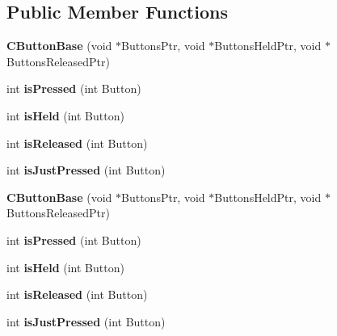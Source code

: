 \subsection*{Public Member Functions}
\begin{DoxyCompactItemize}
\item 
\hypertarget{class_c_button_base_a9c86334a1e2b3ba2c771b2e574c3dc67}{{\bfseries C\-Button\-Base} (void $\ast$Buttons\-Ptr, void $\ast$Buttons\-Held\-Ptr, void $\ast$Buttons\-Released\-Ptr)}\label{class_c_button_base_a9c86334a1e2b3ba2c771b2e574c3dc67}

\item 
\hypertarget{class_c_button_base_a0d4758b9e756a8c3c2bb39b907ea9170}{int {\bfseries is\-Pressed} (int Button)}\label{class_c_button_base_a0d4758b9e756a8c3c2bb39b907ea9170}

\item 
\hypertarget{class_c_button_base_a67e38daead9d22e33f6a3d85902d1f98}{int {\bfseries is\-Held} (int Button)}\label{class_c_button_base_a67e38daead9d22e33f6a3d85902d1f98}

\item 
\hypertarget{class_c_button_base_a575dee487bcca1abf29c1084dfdd5bb8}{int {\bfseries is\-Released} (int Button)}\label{class_c_button_base_a575dee487bcca1abf29c1084dfdd5bb8}

\item 
\hypertarget{class_c_button_base_ab74fd21217c5e379a613b7474af4f9b8}{int {\bfseries is\-Just\-Pressed} (int Button)}\label{class_c_button_base_ab74fd21217c5e379a613b7474af4f9b8}

\item 
\hypertarget{class_c_button_base_a9c86334a1e2b3ba2c771b2e574c3dc67}{{\bfseries C\-Button\-Base} (void $\ast$Buttons\-Ptr, void $\ast$Buttons\-Held\-Ptr, void $\ast$Buttons\-Released\-Ptr)}\label{class_c_button_base_a9c86334a1e2b3ba2c771b2e574c3dc67}

\item 
\hypertarget{class_c_button_base_a0d4758b9e756a8c3c2bb39b907ea9170}{int {\bfseries is\-Pressed} (int Button)}\label{class_c_button_base_a0d4758b9e756a8c3c2bb39b907ea9170}

\item 
\hypertarget{class_c_button_base_a67e38daead9d22e33f6a3d85902d1f98}{int {\bfseries is\-Held} (int Button)}\label{class_c_button_base_a67e38daead9d22e33f6a3d85902d1f98}

\item 
\hypertarget{class_c_button_base_a575dee487bcca1abf29c1084dfdd5bb8}{int {\bfseries is\-Released} (int Button)}\label{class_c_button_base_a575dee487bcca1abf29c1084dfdd5bb8}

\item 
\hypertarget{class_c_button_base_ab74fd21217c5e379a613b7474af4f9b8}{int {\bfseries is\-Just\-Pressed} (int Button)}\label{class_c_button_base_ab74fd21217c5e379a613b7474af4f9b8}

\end{DoxyCompactItemize}
